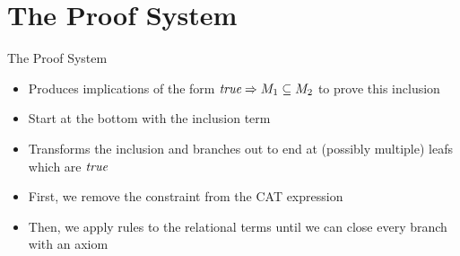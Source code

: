 \documentclass[t,english,aspectratio=169,11pt]{beamer}
\begin{document}
\section{The Proof System}
\begin{frame}{The Proof System}
\begin{itemize}[<+->]
	\item Produces implications of the form $\textit{true} \Rightarrow M_1 \subseteq M_2$ to prove this inclusion
\end{itemize}
	\begin{minipage}{0.65\textwidth}\vspace*{-28pt}
	\begin{itemize}[<+->]
	\item Start at the bottom with the inclusion term
	\item Transforms the inclusion and branches out to end at (possibly multiple) leafs which are $\textit{true}$ 
	\item First, we remove the constraint from the CAT expression
	\item Then, we apply rules to the relational terms until we can close every branch with an axiom
	\end{itemize}
	\end{minipage}\begin{minipage}{0.35\textwidth}\centering
	 \vspace*{22pt}
	\end{minipage}
\end{frame}
\end{document}

